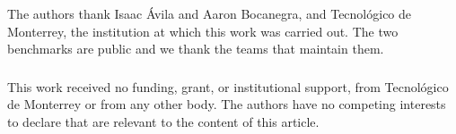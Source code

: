 \documentclass[runningheads]{llncs}
\newif\ifanon
\begin{document}







\appendix


\ifanon\else
\begin{credits}
\subsubsection{\ackname}
The authors thank Isaac Ávila and Aaron Bocanegra, and Tecnológico de Monterrey, the
institution at which this work was carried out. The two benchmarks are public and we thank
the teams that maintain them.

\subsubsection{\discintname}
This work received no funding, grant, or institutional support, from Tecnológico de Monterrey
or from any other body. The authors have no competing interests to declare that are relevant
to the content of this article.
\end{credits}
\fi



\end{document}
